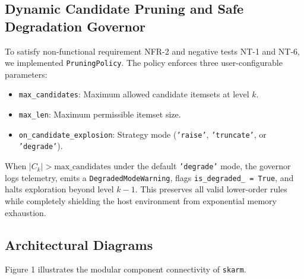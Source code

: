 \documentclass[11pt,a4paper]{article}
\begin{document}
\subsection{Dynamic Candidate Pruning and Safe Degradation Governor}
To satisfy non-functional requirement NFR-2 and negative tests NT-1 and NT-6, we implemented \texttt{PruningPolicy}. The policy enforces three user-configurable parameters:
\begin{itemize}
    \item \texttt{max\_candidates}: Maximum allowed candidate itemsets at level $k$.
    \item \texttt{max\_len}: Maximum permissible itemset size.
    \item \texttt{on\_candidate\_explosion}: Strategy mode (\texttt{'raise'}, \texttt{'truncate'}, or \texttt{'degrade'}).
\end{itemize}

When $|C_k| > \text{max\_candidates}$ under the default \texttt{'degrade'} mode, the governor logs telemetry, emits a \texttt{DegradedModeWarning}, flags \texttt{is\_degraded\_ = True}, and halts exploration beyond level $k-1$. This preserves all valid lower-order rules while completely shielding the host environment from exponential memory exhaustion.

\subsection{Architectural Diagrams}

Figure 1 illustrates the modular component connectivity of \texttt{skarm}.
\end{document}
